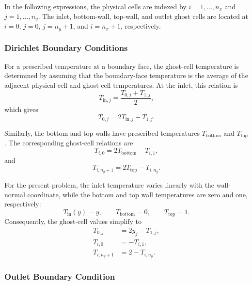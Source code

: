 In the following expressions, the physical cells are indexed by
$i=1,\ldots,n_x$ and $j=1,\ldots,n_y$. The inlet, bottom-wall,
top-wall, and outlet ghost cells are located at
$i=0$, $j=0$, $j=n_y+1$, and $i=n_x+1$, respectively.

\subsubsection{Dirichlet Boundary Conditions}

For a prescribed temperature at a boundary face, the ghost-cell
temperature is determined by assuming that the boundary-face
temperature is the average of the adjacent physical-cell and
ghost-cell temperatures. At the inlet, this relation is
\begin{equation}
T_{\mathrm{in},j}
=
\frac{T_{0,j}+T_{1,j}}{2},
\end{equation}
which gives
\begin{equation}
\boxed{
T_{0,j}=2T_{\mathrm{in},j}-T_{1,j}.
}
\label{eq:ghost_inlet}
\end{equation}

Similarly, the bottom and top walls have prescribed temperatures
$T_{\mathrm{bottom}}$ and $T_{\mathrm{top}}$. The corresponding
ghost-cell relations are
\begin{equation}
\boxed{
T_{i,0}
=
2T_{\mathrm{bottom}}-T_{i,1},
}
\label{eq:ghost_bottom}
\end{equation}
and
\begin{equation}
\boxed{
T_{i,n_y+1}
=
2T_{\mathrm{top}}-T_{i,n_y}.
}
\label{eq:ghost_top}
\end{equation}

For the present problem, the inlet temperature varies linearly
with the wall-normal coordinate, while the bottom and top wall
temperatures are zero and one, respectively:
\begin{equation}
T_{\mathrm{in}}(y)=y,
\qquad
T_{\mathrm{bottom}}=0,
\qquad
T_{\mathrm{top}}=1.
\end{equation}
Consequently, the ghost-cell values simplify to
\begin{align}
T_{0,j}&=2y_j-T_{1,j},
\label{eq:ghost_inlet_specific}
\\
T_{i,0}&=-T_{i,1},
\label{eq:ghost_bottom_specific}
\\
T_{i,n_y+1}&=2-T_{i,n_y}.
\label{eq:ghost_top_specific}
\end{align}

\subsubsection{Outlet Boundary Condition}

